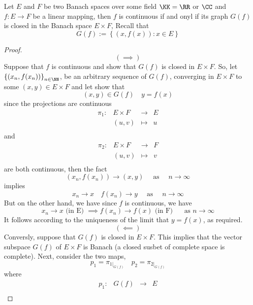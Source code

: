 % 
% 
% 
\lecday[2025-04-22]

% 

\begin{theorem}
	Let $E $ and $F $ be two Banach spaces
	over some field $\KK = \RR  $ or $\CC  $ and 
	$ f : E \longrightarrow F $ be a linear mapping, 
	then $f $ is continuous if and onyl if its graph
	$G(f)  $  is closed in the Banach space 
	$E \times F  $, Recall that 
	\[
	G(f) := 
	\left\{ (x, f(x) ) : x \in  E \right\}
	\]
\end{theorem}
\begin{proof}
\[
	( \implies ) 
\]
Suppose that $f $ is continuous and show that 
$G(f)  $  is closed in $E \times F  $. So, let 
$\left\{ (x_{n}, f(x_{n}) )  \right\}_{n \in \NN} $, be an 
arbitrary sequence of $G(f)  $, converging in $E \times F  $ 
to some $(x,y) \in  E\times F  $ and let show that  
\[
	(x,y)  \in  G(f)  \quad y = f(x) 
\]
since the projections are continuous 
\[
\begin{array}{cccc}
      \pi _{1} : & E \times F    & \longrightarrow &  E\\

           &    (u,v) & \longmapsto     &  u\\ 
\end{array}
\]
and 
\[
\begin{array}{cccc}
      \pi _{2} : &  E \times F   & \longrightarrow &  F\\

           &    (u,v) & \longmapsto     &  v\\ 
\end{array}
\]
are both continuous, then the fact 
\[
	(x_{n}, f(x_{n}) )  \rightarrow (x,y) \quad 
	\text{ as } \quad n \rightarrow \infty 
\]
implies 
\[
	x_{n}  \rightarrow x \quad 
	f(x_{n})  \rightarrow y  \quad \text{ as } \quad 
	n \rightarrow \infty 
\]
But on the other hand, we have 
since $f $ is continuous, we have 
\[
x_{n} \rightarrow  x \text{ (in E) }  \implies 
f(x_{n})  \rightarrow  f(x)  \text{ (in F) } \quad \text{ as } n \rightarrow \infty  
\]
It follows according to the uniqueness of the limit that $y = f(x)  $,
as required.
\[
	(  \impliedby ) 
\]
Conversly, suppose that $G(f)  $  is closed in $E \times F  $.
This implies that the vector subspace 
$G(f)  $  of $E \times F  $  is Banach (a closed susbet of
complete space is complete). Next, consider the two maps, 
\[
p_1 = \pi _{1|_{G(f) }} \quad 
p_2 = \pi _{2|_{G(f) }}
\]
where
\[
\begin{array}{cccc}
      p_1 : &  G(f)   & \longrightarrow & E \\


\end{array}\]
\end{proof}
